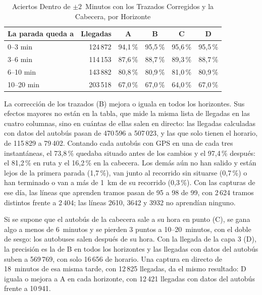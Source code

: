 \begin{table}[ht]
\centering
\caption{Aciertos Dentro de $\pm2$~Minutos con los Trazados Corregidos y la Cabecera, por Horizonte}\label{tab:trazados}
\begin{tabular}{@{}lrcccc@{}}
\toprule
La parada queda a & Llegadas & A & B & C & D\\
\midrule
0--3 min   & 124\,872 & 94,1\,\% & 95,5\,\% & 95,6\,\% & 95,5\,\%\\
3--6 min   & 114\,153 & 87,6\,\% & 88,7\,\% & 89,3\,\% & 88,7\,\%\\
6--10 min  & 143\,882 & 80,8\,\% & 80,9\,\% & 81,0\,\% & 80,9\,\%\\
10--20 min & 203\,518 & 67,0\,\% & 67,0\,\% & 64,0\,\% & 67,0\,\%\\
\bottomrule
\end{tabular}
\end{table}

La corrección de los trazados (B) mejora o iguala en todos los horizontes. Sus efectos mayores no
están en la tabla, que mide la misma lista de llegadas en las cuatro columnas, sino en cuántas de ellas salen en
directo: las llegadas calculadas con datos del autobús pasan de 470\,596 a 507\,023, y las que solo tienen el horario, de
115\,829 a 79\,402. Contando cada autobús con GPS en una de cada tres instantáneas, el 73{,}8\,\% quedaba situado antes de
los cambios y el 97{,}4\,\% después: el 81{,}2\,\% en ruta y el 16{,}2\,\% en la cabecera. Los demás aún no han
salido y están lejos de la primera parada (1{,}7\,\%), van junto al recorrido sin situarse (0{,}7\,\%) o han
terminado o van a más de 1~km de su recorrido (0{,}3\,\%). Con las capturas de ese día, las líneas que aprenden tramos
pasan de 95 a 98 de 99, con 2\,624 tramos distintos frente a 2\,404; las líneas 2610, 3642 y 3932 no aprendían ninguno.

Si se supone que el autobús de la cabecera sale a su hora en punto (C), se gana algo a menos de 6~minutos y se
pierden 3 puntos a 10--20~minutos, con el doble de sesgo: los autobuses salen después de su hora. Con la llegada de la capa 3 (D), la precisión es la de B
en todos los horizontes y las llegadas con datos del autobús suben a 569\,769, con solo 16\,656 de horario. Una captura en
directo de 18~minutos de esa misma tarde, con 12\,825 llegadas, da el mismo resultado: D iguala o mejora a A en cada horizonte,
con 12\,421 llegadas con datos del autobús frente a 10\,941.

